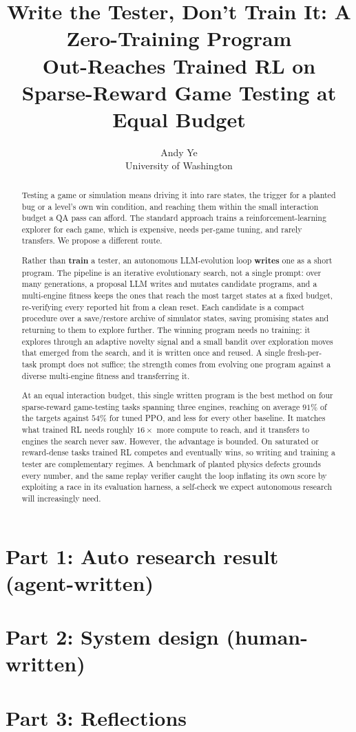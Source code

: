 \documentclass[11pt]{article}
\title{Write the Tester, Don't Train It: A Zero-Training Program\\Out-Reaches Trained RL on Sparse-Reward Game Testing at Equal Budget}
\author{Andy Ye \\ University of Washington}
\begin{document}
\maketitle
\begin{abstract}
Testing a game or simulation means driving it into rare states, the trigger for a planted bug or a level's own win
condition, and reaching them within the small interaction budget a QA pass can afford. The standard approach trains a
reinforcement-learning explorer for each game, which is expensive, needs per-game tuning, and rarely transfers. We propose
a different route.

Rather than \textbf{train} a tester, an autonomous LLM-evolution loop \textbf{writes} one as a short program. The pipeline
is an iterative evolutionary search, not a single prompt: over many generations, a proposal LLM writes and mutates
candidate programs, and a multi-engine fitness keeps the ones that reach the most target states at a fixed budget,
re-verifying every reported hit from a clean reset. Each candidate is a compact procedure over a save/restore archive of
simulator states, saving promising states and returning to them to explore further. The winning program needs no training:
it explores through an adaptive novelty signal and a small bandit over exploration moves that emerged from the search, and
it is written once and reused. A single fresh-per-task prompt does not suffice; the strength comes from evolving one
program against a diverse multi-engine fitness and transferring it.

At an equal interaction budget, this single written program is the best method on four sparse-reward game-testing tasks
spanning three engines, reaching on average $91\%$ of the targets against $54\%$ for tuned PPO, and less for every other
baseline. It matches what trained RL needs roughly $16\times$ more compute to reach, and it transfers to engines the search
never saw. However, the advantage is bounded. On saturated or reward-dense tasks trained RL competes and eventually wins,
so writing and training a tester are complementary regimes. A benchmark of planted physics defects grounds every number,
and the same replay verifier caught the loop inflating its own score by exploiting a race in its evaluation harness, a
self-check we expect autonomous research will increasingly need.
\end{abstract}

\section*{Part 1: Auto research result (agent-written)}


\section*{Part 2: System design (human-written)}


\section*{Part 3: Reflections}




\end{document}
